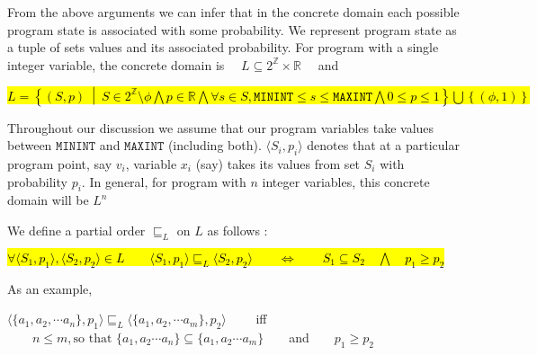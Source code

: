 \documentclass[final,3p, review, times]{util/elsarticle}
\begin{document}
From the above arguments we can infer that in the concrete domain each possible program state is associated with some probability. We represent program state as a tuple of sets values and its associated probability. For program with a single integer variable, the concrete domain is $\quad L\subseteq2^{\mathbb{Z}}\times\mathbb{R}\quad$ and

\centerline{
  \hl{$L=\left\{\left(S,p\right)\ \middle|\ S\in2^{\mathbb{Z}}\setminus\phi\bigwedge p\in\mathbb{R}\bigwedge \forall s\in S, \mathtt{MININT}\leq s\leq\mathtt{MAXINT}\bigwedge 0\leq p\leq1\right\}\bigcup\left\{\left(\phi,1\right)\right\}$}
}

Throughout our discussion we assume that our program variables take values between $\mathbf{\mathtt{MININT}}$ and $\mathbf{\mathtt{MAXINT}}$ (including both). $\langle S_i,p_i\rangle$ denotes that at a particular program point, say $v_i$, variable $x_i$ (say) takes its values from set $S_i$ with probability $p_i$. In general, for program with $n$ integer variables, this concrete domain will be $L^n$

We define a partial order $\sqsubseteq_L$ on $L$ as follows :

\centerline{\hl{$\forall \langle S_1,p_1\rangle, \langle S_2,p_2\rangle\in L\qquad \langle S_1,p_1\rangle\sqsubseteq_L \langle S_2,p_2\rangle\qquad\iff \qquad S_1\subseteq S_2\quad\bigwedge\quad p_1\geq p_2$}}

As an example,\\
\centerline{
  $\langle\{a_1, a_2,\cdots a_n\},p_1\rangle\sqsubseteq_L\langle\{a_1, a_2,\cdots a_m\},p_2\rangle\qquad$ iff $\qquad n\leq m, \text{so that\ }\{a_1,a_2\cdots a_n\}\subseteq\{a_1,a_2\cdots a_m\}\qquad$and$\qquad p_1\geq p_2$
}
\end{document}
